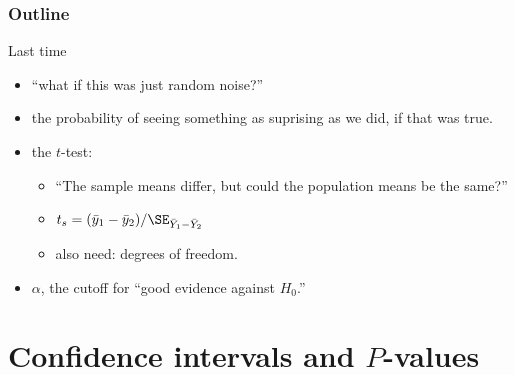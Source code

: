 
%
%
%



\subtitle{hypothesis testing, and one-sided tests}

\date{5 March 2015}





\begin{frame}
  \maketitle
\end{frame}


\begin{frame}\frametitle<presentation>{Outline}
  \tableofcontents
\end{frame}

\begin{frame}{Last time}

  \begin{itemize}
    \item {} ``what if this was just random noise?''
    \item {} the probability of seeing something as suprising as we did, if that was true.
    \item the $t$-test: 
      \begin{itemize}
        \item ``The sample means differ, but could the population means be the same?''
        \item $t_s = (\bar y_1 - \bar y_2) / \SE_{\bar Y_1 - \bar Y_2}$
        \item also need: degrees of freedom.
      \end{itemize}
    \item {} $\alpha$, the cutoff for ``good evidence against $H_0$.''
  \end{itemize}

\end{frame}


\section{Confidence intervals and $P$-values}


